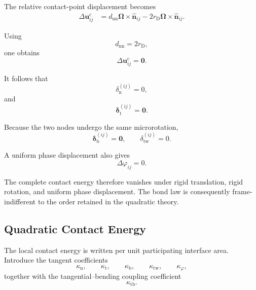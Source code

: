The relative contact-point displacement becomes
\begin{equation}
\begin{aligned}
    \Delta\mathbf{u}_{ij}^{\mathrm{c}} &= d_{\mathrm{nn}} \boldsymbol{\Omega} \times \hat{\mathbf{n}}_{ij} - 2r_{\mathrm{D}} \boldsymbol{\Omega} \times \hat{\mathbf{n}}_{ij}.
\end{aligned}
\end{equation}

Using
\begin{equation}
    d_{\mathrm{nn}} = 2r_{\mathrm{D}},
\end{equation}
one obtains
\begin{equation}
    \boxed{ \Delta\mathbf{u}_{ij}^{\mathrm{c}} = \mathbf{0} }.
\end{equation}

It follows that
\begin{equation}
    \delta_{\mathrm{n}}^{(ij)} = 0,
\end{equation}
and
\begin{equation}
    \boldsymbol{\delta}_{\mathrm{t}}^{(ij)} = \mathbf{0}.
\end{equation}

Because the two nodes undergo the same microrotation,
\begin{equation}
    \boldsymbol{\delta}_{\mathrm{b}}^{(ij)} = \mathbf{0}, \qquad \delta_{\mathrm{tw}}^{(ij)} = 0.
\end{equation}

A uniform phase displacement also gives
\begin{equation}
    \Delta\varphi_{ij} = 0.
\end{equation}

The complete contact energy therefore vanishes under rigid translation, rigid rotation, and uniform phase displacement. The bond law is consequently frame-indifferent to the order retained in the quadratic theory.

\subsection{Quadratic Contact Energy}

The local contact energy is written per unit participating interface area. Introduce the tangent coefficients
\begin{equation}
    \kappa_{\mathrm{n}}, \qquad \kappa_{\mathrm{t}}, \qquad \kappa_{\mathrm{b}}, \qquad \kappa_{\mathrm{tw}}, \qquad \kappa_{\varphi},
\end{equation}
together with the tangential--bending coupling coefficient
\begin{equation}
    \kappa_{\mathrm{tb}}.
\end{equation}

